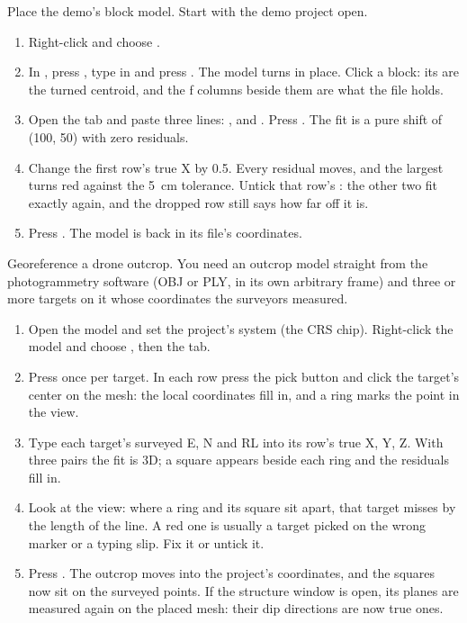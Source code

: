 \begin{tryit}
Place the demo's block model. Start with the demo project open.
\begin{enumerate}
\item Right-click  and choose .
\item In , press , type  in  and press . The model turns in place. Click a block: its   are the turned centroid, and the ƒ columns    beside them are what the file holds.
\item Open the  tab and paste three lines: ,  and . Press . The fit is a pure shift of (100, 50) with zero residuals.
\item Change the first row's true X by 0.5. Every residual moves, and the largest turns red against the 5~cm tolerance. Untick that row's : the other two fit exactly again, and the dropped row still says how far off it is.
\item Press . The model is back in its file's coordinates.
\end{enumerate}
\end{tryit}

\begin{tryit}
Georeference a drone outcrop. You need an outcrop model straight from the photogrammetry software
(OBJ or PLY, in its own arbitrary frame) and three or more targets on it whose coordinates the
surveyors measured.
\begin{enumerate}
\item Open the model and set the project's system (the CRS chip). Right-click the model and choose
  , then the  tab.
\item Press  once per target. In each row press the pick button and click the target's
  center on the mesh: the local coordinates fill in, and a ring marks the point in the view.
\item Type each target's surveyed E, N and RL into its row's true X, Y, Z. With three pairs the fit
  is 3D; a square appears beside each ring and the residuals fill in.
\item Look at the view: where a ring and its square sit apart, that target misses by the length of
  the line. A red one is usually a target picked on the wrong marker or a typing slip. Fix it or
  untick it.
\item Press . The outcrop moves into the project's coordinates, and the squares now sit
  on the surveyed points. If the structure window is open, its planes are measured again on the
  placed mesh: their dip directions are now true ones.
\end{enumerate}
\end{tryit}


